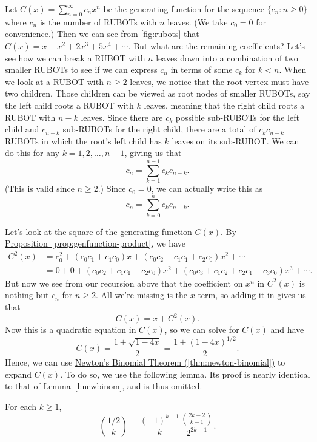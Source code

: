 Let $C(x) = \sum_{n=0}^\infty c_n x^n$ be the generating function for
the sequence $\{c_n\colon n\geq 0\}$ where $c_n$ is the number of
RUBOTs with $n$ leaves. (We take $c_0=0$ for convenience.) Then we can
see from \autoref{fig:rubots} that $C(x) = x + x^2 + 2x^3 + 5x^4 +
\cdots$. But what are the remaining coefficients? Let's see how we can
break a RUBOT with $n$ leaves down into a combination of two smaller
RUBOTs to see if we can express $c_n$ in terms of some $c_k$ for $k<
n$. When we look at a RUBOT with $n\geq 2$ leaves, we notice that the
root vertex must have two children. Those children can be viewed as
root nodes of smaller RUBOTs, say the left child roots a RUBOT with
$k$ leaves, meaning that the right child roots a RUBOT with $n-k$
leaves. Since there are $c_k$ possible sub-RUBOTs for the left child
and $c_{n-k}$ sub-RUBOTs for the right child, there are a total of
$c_kc_{n-k}$ RUBOTs in which the root's left child has $k$ leaves on
its sub-RUBOT. We can do this for any $k=1,2,\dots,n-1$, giving us
that
\[c_n = \sum_{k=1}^{n-1} c_kc_{n-k}.\]
(This is valid since $n\geq 2$.)
Since $c_0=0$, we can actually write this as
\[c_n = \sum_{k=0}^{n} c_kc_{n-k}.\]

Let's look at the square of the generating function $C(x)$. By
\hyperref[prop:genfunction-product]{Proposition~\ref*{prop:genfunction-product}},
we have
\begin{align*}
  C^2(x) &= c_0^2 + (c_0c_1 + c_1c_0)x + (c_0c_2 +c_1c_1 + c_2c_0)x^2 +
  \cdots\\
  & = 0 + 0 + (c_0c_2 +c_1c_1 + c_2c_0)x^2 + (c_0c_3 +
  c_1c_2+c_2c_1+c_3c_0)x^3 + \cdots.
\end{align*}
But now we see from our recursion above that the coefficient on $x^n$
in $C^2(x)$ is nothing but $c_n$ for $n\geq 2$. All we're missing is
the $x$ term, so adding it in gives us that
\[C(x) = x + C^2(x).\]
Now this is a quadratic equation in $C(x)$, so we can solve for $C(x)$
and have
\[C(x) = \frac{1\pm \sqrt{1-4x}}{2} = \frac{1\pm (1-4x)^{1/2}}{2} .\]
Hence, we can use \hyperref[thm:newton-binomial]{Newton's Binomial
  Theorem (\ref*{thm:newton-binomial})} to expand $C(x)$. To do so, we
use the following lemma. Its proof is nearly identical to that of
\hyperref[l:newbinom]{Lemma~\ref*{l:newbinom}}, and is thus omitted.

\begin{lemma}\label{l:half-binomial}
For each $k\ge 1$,
\[
\binom{1/2}{k}=\frac{(-1)^{k-1}}{k}\frac{\binom{2k-2}{k-1}}{2^{2k-1}}.
\]
\end{lemma}

